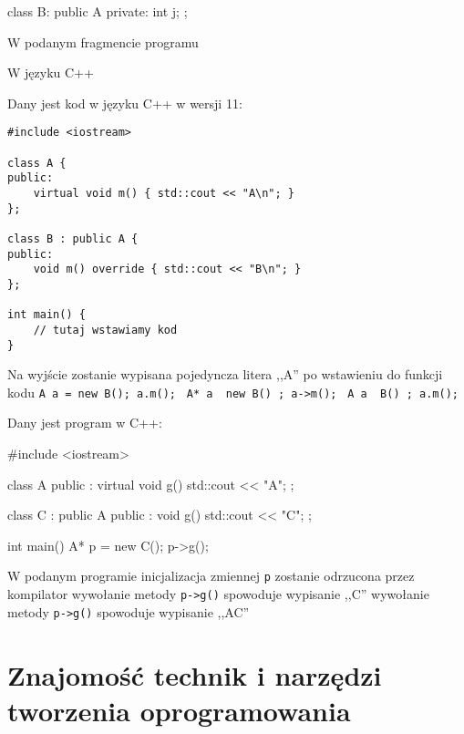 \begin{problems}
\begin{cpp}
    class B: public A {
    private:
        int j;
    };
\end{cpp}
W podanym fragmencie programu

\prob W języku C++

\prob Dany jest kod w języku C++ w wersji 11:
\begin{verbatim}
#include <iostream>

class A {
public:
    virtual void m() { std::cout << "A\n"; }
};

class B : public A {
public:
    void m() override { std::cout << "B\n"; }
};

int main() {
    // tutaj wstawiamy kod
}
\end{verbatim}
Na wyjście zostanie wypisana pojedyncza litera ,,A'' po wstawieniu do funkcji  kodu
\answers
{\texttt{A a = new B(); a.m(); }}
{\texttt{A* a { new B() }; a->m(); }}
{\texttt{A a { B() }; a.m(); }}

\prob Dany jest program w C++:
\begin{cpp}
    #include <iostream>
    
    class A {
    public :
        virtual void g() {
            std::cout << "A";
        }
    };
    
    class C : public A {
    public :
        void g() {
            std::cout << "C";
        }
    };
    
    int main() {
        A* p = new C(); 
        p->g();
    }
\end{cpp}
W podanym programie
\answers
{inicjalizacja zmiennej \texttt{p} zostanie odrzucona przez kompilator}
{wywołanie metody \texttt{p->g()} spowoduje wypisanie ,,C''}
{wywołanie metody \texttt{p->g()} spowoduje wypisanie ,,AC''}
\end{problems}

\section{Znajomość technik i narzędzi tworzenia oprogramowania}

